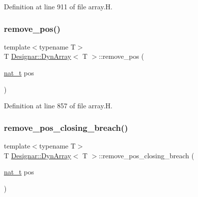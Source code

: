 Definition at line 911 of file array.\+H.

\mbox{\label{class_designar_1_1_dyn_array_a85bfa3cc9b650ae6774c17bd4a03c677}} 
\subsubsection{\texorpdfstring{remove\+\_\+pos()}{remove\_pos()}}
{\footnotesize\ttfamily template$<$typename T$>$ \\
T \hyperlink{class_designar_1_1_dyn_array}{Designar\+::\+Dyn\+Array}$<$ T $>$\+::remove\+\_\+pos (\begin{DoxyParamCaption}\item[{\hyperlink{namespace_designar_aa72662848b9f4815e7bf31a7cf3e33d1}{nat\+\_\+t}}]{pos }\end{DoxyParamCaption})\hspace{0.3cm}{\ttfamily [inline]}}



Definition at line 857 of file array.\+H.

\mbox{\label{class_designar_1_1_dyn_array_ac7451bfdc3b008a478fbfe03478e736d}} 
\subsubsection{\texorpdfstring{remove\+\_\+pos\+\_\+closing\+\_\+breach()}{remove\_pos\_closing\_breach()}}
{\footnotesize\ttfamily template$<$typename T$>$ \\
T \hyperlink{class_designar_1_1_dyn_array}{Designar\+::\+Dyn\+Array}$<$ T $>$\+::remove\+\_\+pos\+\_\+closing\+\_\+breach (\begin{DoxyParamCaption}\item[{\hyperlink{namespace_designar_aa72662848b9f4815e7bf31a7cf3e33d1}{nat\+\_\+t}}]{pos }\end{DoxyParamCaption})\hspace{0.3cm}{\ttfamily [inline]}}



